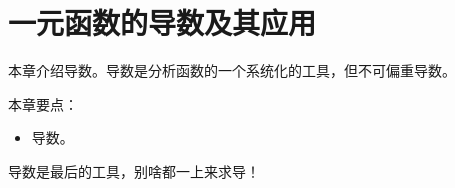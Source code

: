 \chapter{一元函数的导数及其应用}

本章介绍导数。导数是分析函数的一个系统化的工具，但不可偏重导数。

本章要点：
\begin{itemize}
    \item 导数。
\end{itemize}

\begin{tcolorbox}
导数是最后的工具，别啥都一上来求导！
\end{tcolorbox}

\newpage


\newpage


\newpage


\newpage





